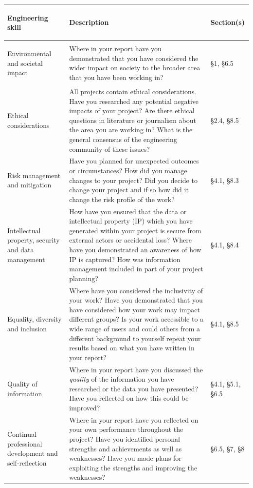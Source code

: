 \documentclass[a4paper,12pt]{article}
\begin{document}
\renewcommand{\arraystretch}{1.4}
\begin{tabularx}{\textwidth}{|>{\bfseries\raggedright\arraybackslash}p{4.2cm}|X|>{\centering\arraybackslash}p{2.4cm}|}
\hline
Engineering skill & Description & Section(s) \\
\hline

Environmental and societal impact &
Where in your report have you demonstrated that you have considered the wider impact on society to the broader area that you have been working in? &
\S1, \S6.5 \\
\hline

Ethical considerations &
All projects contain ethical considerations. Have you researched any potential negative impacts of your project? Are there ethical questions in literature or journalism about the area you are working in? What is the general consensus of the engineering community of these issues? &
\S2.4, \S8.5 \\
\hline

Risk management and mitigation &
Have you planned for unexpected outcomes or circumstances? How did you manage changes to your project? Did you decide to change your project and if so how did it change the risk profile of the work? &
\S4.1, \S8.3 \\
\hline

Intellectual property, security and data management &
How have you ensured that the data or intellectual property (IP) which you have generated within your project is secure from external actors or accidental loss? Where have you demonstrated an awareness of how IP is captured? How was information management included in part of your project planning? &
\S4.1, \S8.4 \\
\hline

Equality, diversity and inclusion &
Where have you considered the inclusivity of your work? Have you demonstrated that you have considered how your work may impact different groups? Is your work accessible to a wide range of users and could others from a different background to yourself repeat your results based on what you have written in your report? &
\S4.1, \S8.5 \\
\hline

Quality of information &
Where in your report have you discussed the \textit{quality} of the information you have researched or the data you have presented? Have you reflected on how this could be improved? &
\S4.1, \S5.1, \S6.5 \\
\hline

Continual professional development and self-reflection &
Where in your report have you reflected on your own performance throughout the project? Have you identified personal strengths and achievements as well as weaknesses? Have you made plans for exploiting the strengths and improving the weaknesses? &
\S6.5, \S7, \S8 \\
\hline

\end{tabularx}
\renewcommand{\arraystretch}{1.0}
\end{document}
